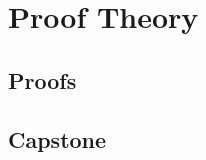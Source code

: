 \chapter{Proof Theory}
\label{chap:proof-theory}




\LRAExcludeFromPrintEditionBegin
\section*{Proofs}


\section*{Capstone}

\LRAExcludeFromPrintEditionEnd

